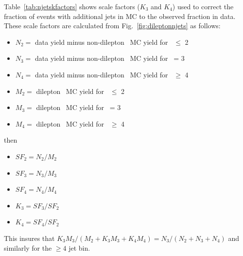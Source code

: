

Table~\ref{tab:njetskfactors}  shows scale factors ($K_3$ and $K_4$)
used to correct the
fraction of events with additional jets in MC to the observed fraction
in data.   These scale factors are calculated from Fig.~\ref{fig:dileptonnjets} 
as follows:
\begin{itemize}
\item $N_{2}=$ data yield minus non-dilepton \ttbar\ MC yield for \njets\ $\leq$ 2
\item $N_{3}=$ data yield minus non-dilepton \ttbar\ MC yield for \njets\ = 3
\item $N_{4}=$ data yield minus non-dilepton \ttbar\ MC yield for \njets\ $\geq$ 4
\item $M_{2}=$ dilepton \ttbar\ MC yield for \njets\ $\leq$ 2
\item $M_{3}=$ dilepton \ttbar\ MC yield for \njets\ = 3
\item $M_{4}=$ dilepton \ttbar\ MC yield for \njets\ $\geq$ 4
\end{itemize}
\noindent then
\begin{itemize}
\item $SF_2 = N_2 / M_2$
\item $SF_3 = N_3 / M_3$
\item $SF_4 = N_4 / M_4$
\item $K_3 = SF_3 / SF_2$
\item $K_4 = SF_4 / SF_2$
\end{itemize}
\noindent This insures that $K_3 M_3/(M_2 + K_3 M_3 + K_4 M_4) = N_3 /
(N_2+N_3+N_4)$ and similarly for the $\geq 4$ jet bin.



